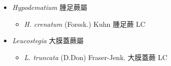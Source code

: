 
  \begin{itemize}
 \item[] \textit{Hypodematium} 腫足蕨屬
                                
  \begin{itemize}
        \item[] \textit{H. crenatum} (Forssk.) Kuhn  腫足蕨   LC
  \end{itemize}
 \item[] \textit{Leucostegia} 大膜蓋蕨屬
                                
  \begin{itemize}
        \item[] \textit{L. truncata} (D.Don) Fraser-Jenk.  大膜蓋蕨   LC
  \end{itemize}
  \end{itemize}
